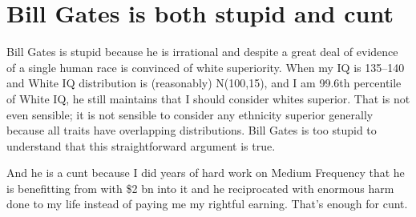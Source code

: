 \documentclass{amsart}
\begin{document}
\section{Bill Gates is both stupid and cunt}

Bill Gates is stupid because he is irrational and despite a great deal of evidence of a single human race is convinced of white superiority.  When my IQ is 135--140 and White IQ distribution is (reasonably) N(100,15), and I am 99.6th percentile of White IQ, he still maintains that I should consider whites superior.  That is not even sensible; it is not sensible to consider any ethnicity superior generally because all traits have overlapping distributions.  Bill Gates is too stupid to understand that this straightforward argument is true.  

And he is a cunt because I did years of hard work on Medium Frequency that he is benefitting from with \$2 bn into it and he reciprocated with enormous harm done to my life instead of paying me my rightful earning.  That's enough for cunt.
\end{document}
